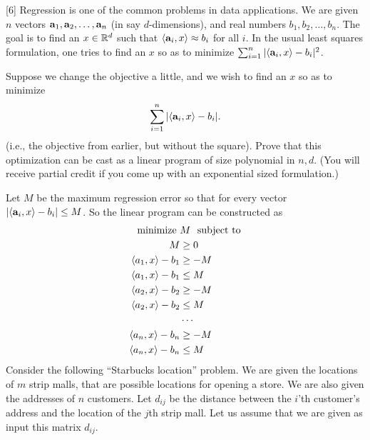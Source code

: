 \documentclass[addpoints]{exam}
\begin{document}
\begin{questions}

[6]
Regression is one of the common problems in data applications.  We are given $n$ vectors $\mathbf{a}_1, \mathbf{a}_2, \dots, \mathbf{a}_n$ (in say $d$-dimensions), and real numbers $b_1, b_2, \dots, b_n$.  The goal is to find an $x \in \mathbb{R}^d$ such that $\langle \mathbf{a}_i, x \rangle \approx b_i$ for all $i$. In the usual least squares formulation, one tries to find an $x$ so as to minimize $\sum_{i=1}^n | \langle \mathbf{a}_i, x \rangle - b_i|^2$.

Suppose we change the objective a little, and we wish to find an $x$ so as to minimize
\[ \sum_{i=1}^n | \langle \mathbf{a}_i, x \rangle - b_i|. \]
(i.e., the objective from earlier, but without the square).  Prove that this optimization can be cast as a linear program of size polynomial in $n, d$.  (You will receive partial credit if you come up with an exponential sized formulation.)

Let $M$ be the maximum regression error so that for every vector $|\langle \mathbf{a}_i, x \rangle - b_i| \leq M$. So the linear program can be constructed as
\begin{align*}
\text{minimize } &M ~~\text{subject to} \\
M &\geq 0\\
\langle a_1, x \rangle -b_1 &\ge -M \\
\langle a_1, x \rangle -b_1 &\le M \\
\langle a_2, x \rangle -b_2 &\ge -M \\
\langle a_2, x \rangle -b_2 &\le M \\
&\cdots \\
\langle a_n, x \rangle -b_n &\ge -M \\
\langle a_n, x \rangle -b_n &\le M \\
\end{align*}
Consider the following ``Starbucks location'' problem. We are given the locations of $m$ strip malls, that are possible locations for opening a store.  We are also given the addresses of $n$ customers.  Let $d_{ij}$ be the distance between the $i$'th customer's address and the location of the $j$th strip mall. Let us assume that we are given as input this matrix $d_{ij}$.


\end{questions}
\end{document}
